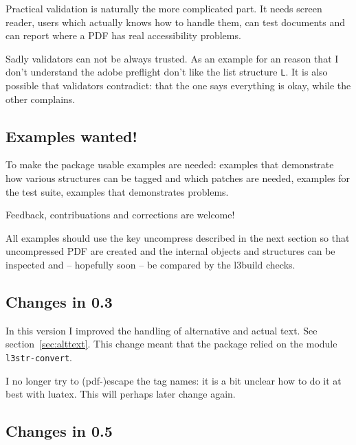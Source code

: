 \documentclass[DIV=12,parskip=half-,bibliography=totoc]{scrartcl}
\newcommand\PrintKeyName[1]{\textsf{#1}}
\newcommand\PDF{PDF}
\begin{document}
Practical validation is naturally the more complicated part. It needs screen reader, users which actually knows how to handle them, can test documents and can report where a \PDF{} has real accessibility problems.



Sadly validators can not be always trusted. As an example for an reason that I don't understand the adobe preflight don't like the list structure \texttt{L}.
It is also possible that validators contradict: that the one says everything is okay, while the other complains.



\subsection{Examples wanted!}


To make the package usable examples are needed: examples that demonstrate how various structures can be tagged and which patches are needed, examples for the test suite, examples that demonstrates problems.


\begin{tcolorbox}[before upper=\tagpdfparaOn]
Feedback, contribuations and corrections are welcome!
\end{tcolorbox}


All examples should use the  key \PrintKeyName{uncompress} described in the next section so that uncompressed \PDF{} are created and the internal objects and structures can be inspected and -- hopefully soon -- be compared by the l3build checks.%



\subsection{Changes in 0.3}


In this version I improved the handling of alternative and actual text. See section~\ref{sec:alttext}. This change meant that the package relied on the module \texttt{l3str-convert}.

I no longer try to (pdf-)escape the tag names: it is a bit unclear how to do it at best with luatex. This will perhaps later change again.




\subsection{Changes in 0.5}
\end{document}
